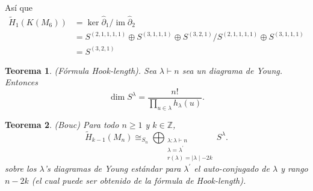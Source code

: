 \documentclass[12pt]{book}
\newtheorem{theorem}{Teorema}[section]
\theoremstyle{definition}
\DeclareMathOperator{\im}{im}
\newcounter{in}
\begin{document}
 Así que
 \begin{align*}
    \widetilde H_{1}(K(M_{6}))&=\ker\widehat\partial_{1}/\im\widehat\partial_{2}\\
    &=S^{(2,1,1,1,1)}\oplus S^{(3,1,1,1)}\oplus S^{(3,2,1)}/S^{(2,1,1,1,1)}\oplus S^{(3,1,1,1)}\\
    &=S^{(3,2,1)}
\end{align*}

\begin{theorem}{(Fórmula Hook-length).} 
  Sea $\lambda\vdash n$ sea un diagrama de Young. Entonces
  $$\dim S^{\lambda}=\frac{n!}{\prod_{u\in \lambda}h_{\lambda}(u)}.$$
\end{theorem}
 
\begin{theorem}(Bouc)
  Para todo $n\geq1$ y $k\in \mathbb{Z}$,
  \begin{equation*}
    \widetilde H_{k-1}(M_{n})\cong_{S_{n}}
    \bigoplus_{
      \substack{\lambda:\lambda\vdash n\\
        \lambda=\lambda^{'}\\
        r(\lambda)=\mid \lambda \mid-2k}} S^{\lambda}.
  \end{equation*}
  sobre los $\lambda$'s diagramas de Young estándar para $\lambda^{'}$
  el auto-conjugado de $\lambda$ y rango $n-2k$ (el cual puede ser
  obtenido de la fórmula de Hook-length).
\end{theorem}



% 

% 

\printindex
\end{document}
